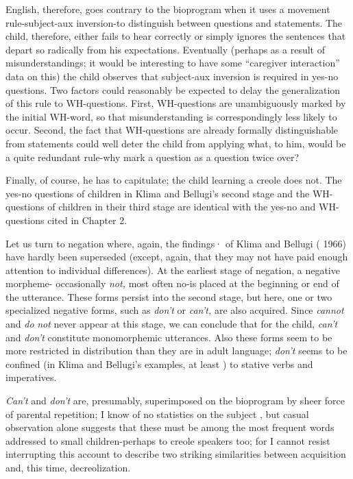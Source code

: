 English, therefore, goes contrary to the bioprogram when it uses a movement rule-subject-aux inversion-to distinguish between ques\-tions and statements. The child, therefore, either fails to hear correctly or simply ignores the sentences that depart so radically from his expec\-tations. Eventually (perhaps as a result of misunderstandings; it would be interesting to have some ``caregiver interaction'' data on this) the child observes that subject-aux inversion is required in yes-no questions. Two factors could reasonably be expected to delay the generalization of this rule to WH-questions. First, WH-questions are unambiguously marked by the initial WH-word, so that misunderstanding is corre\-spondingly less likely to occur. Second, the fact that WH-questions are already formally distinguishable from statements could well deter the child from applying what, to him, would be a quite redundant rule-why mark a question as a question twice over?

Finally, of course, he has to capitulate; the child learning a creole does not. The yes-no questions of children in Klima and Bellugi's
second stage and the WH-questions of children in their third stage are identical with the yes-no and WH-questions cited in Chapter 2.

Let us turn to negation where, again, the findings· of Klima and Bellugi ( 1966) have hardly been superseded (except, again, that they may not have paid enough attention to individual differences). At the earliest stage of negation, a negative morpheme- occasionally \textit{not,} most often no-is placed at the beginning or end of the utterance. These forms persist into the second stage, but here, one or two spe\-cialized negative forms, such as \textit{don't} or \textit{can't,} are also acquired. Since \textit{cannot} and \textit{do} \textit{not} never appear at this stage, we can conclude that for the child, \textit{can't} and \textit{don't} constitute monomorphemic utterances. Also these forms seem to be more restricted in distribution than they are in adult language; \textit{don't} seems to be confined (in Klima and Bellugi's examples, at least ) to stative verbs and imperatives.

\textit{Can't} and \textit{don't} are, presumably, superimposed on the bio\-program by sheer force of parental repetition; I know of no statistics on the subject , but casual observation alone suggests that these must be among the most frequent words addressed to small children-perhaps to creole speakers too; for I cannot resist interrupting this account to describe two striking similarities between acquisition and, this time, decreolization.

